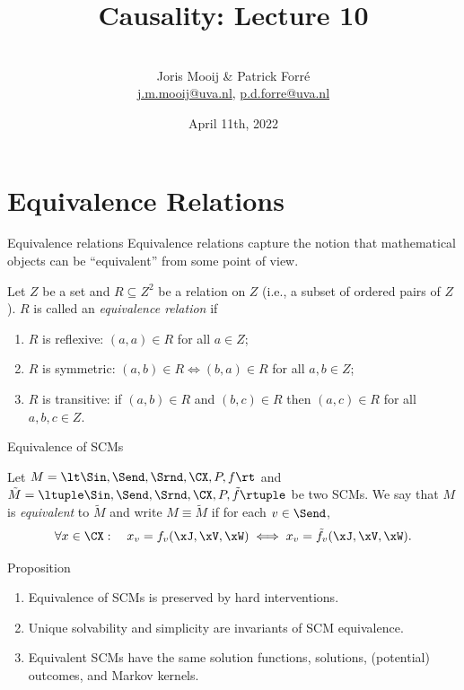 \title[Causality]{Causality: Lecture 10}
\author[Joris Mooij]{\\[5mm]\large Joris Mooij \& Patrick Forr\'e\\
\url{j.m.mooij@uva.nl}, \url{p.d.forre@uva.nl}}
\date[2022-04-11]{\normalsize April 11th, 2022}
\maketitle


\part{Equivalence Relations}
\frame{\partpage}

\begin{frame}{Equivalence relations}
Equivalence relations capture the notion that mathematical objects can be ``equivalent'' from some point of view.
\begin{definition}
  Let $Z$ be a set and $R \subseteq Z^2$ be a relation on $Z$ (i.e., a subset of ordered pairs of $Z$). $R$ is called an \emph{equivalence relation} if 
  \begin{enumerate}
    \item $R$ is reflexive: $(a,a) \in R$ for all $a \in Z$;
    \item $R$ is symmetric: $(a,b) \in R \iff (b,a) \in R$ for all $a,b \in Z$;
    \item $R$ is transitive: if $(a,b) \in R$ and $(b,c) \in R$ then $(a,c) \in R$ for all $a,b,c\in Z$.
  \end{enumerate}
\end{definition}
\end{frame}

\begin{frame}{Equivalence of SCMs}
\begin{definition}
  Let $M = \lt \Sin, \Send, \Srnd, \CX, P, f \rt$ and
  $\tilde{M} = \ltuple \Sin, \Send, \Srnd, \CX, P, \tilde{f} \rtuple$ be two SCMs.
  We say that
  $M$ is \emph{equivalent} to $\tilde{M}$ and write $M \equiv \tilde{M}$ if for each $v \in \Send$,
  $$\forall x \in \CX: \quad x_v = f_v(\xJ,\xV,\xW) \iff x_v = \tilde{f}_v(\xJ,\xV,\xW).$$
\end{definition}
\begin{block}{Proposition}
\begin{enumerate}
  \item Equivalence of SCMs is preserved by hard interventions.
  \item Unique solvability and simplicity are invariants of SCM equivalence.
  \item Equivalent SCMs have the same solution functions, solutions, (potential) outcomes, and Markov kernels.
\end{enumerate}
\end{block}
\end{frame}

